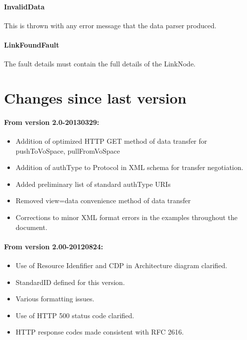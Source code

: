 \documentclass[11pt,a4paper]{ivoa}
\begin{document}
\paragraph{InvalidData}
This is thrown with any error message that the data parser produced.

\paragraph{LinkFoundFault}
The fault details must contain the full details of the LinkNode.

\section{Changes since last version}
\label{sec:changes since last version}

\paragraph{From version 2.0-20130329:}
\begin{itemize}
    \item Addition of optimized HTTP GET method of data transfer for pushToVoSpace, pullFromVoSpace
    \item Addition of authType to Protocol in XML schema for transfer negotiation.
    \item Added preliminary list of standard authType URIs
    \item Removed view=data convenience method of data transfer
    \item Corrections to minor XML format errors in the examples throughout the document.
\end{itemize}

\paragraph{From version 2.00-20120824:}
\begin{itemize}
    \item Use of Resource Idenfifier and CDP in Architecture diagram clarified.
    \item StandardID defined for this version.
    \item Various formatting issues.
    \item Use of HTTP 500 status code clarified.
    \item HTTP response codes made consistent with RFC 2616.
\end{itemize}
\end{document}
